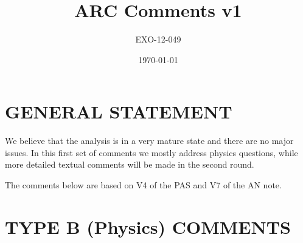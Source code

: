 \documentclass[paper=a4, fontsize=11pt]{scrartcl}
\title{ARC Comments v1}
\author{EXO-12-049}
\date{\today}
\begin{document}
\maketitle
\section{GENERAL STATEMENT}
We believe that the analysis is in a very mature state and there are no major issues. In this first set of comments we mostly address physics questions, while more detailed textual comments will be made in the second round.

The comments below are based on V4 of the PAS and V7 of the AN note.

\section{TYPE B (Physics) COMMENTS}
\end{document}
